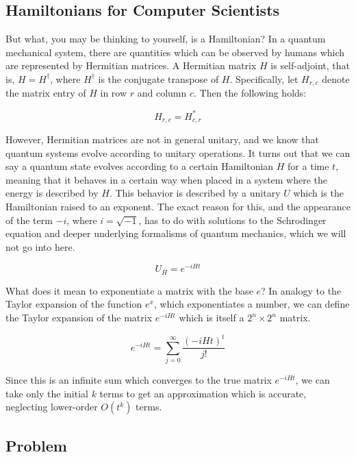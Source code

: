 \subsection{Hamiltonians for Computer Scientists}

But what, you may be thinking to yourself, is a Hamiltonian?
In a quantum mechanical system, there are quantities which can be observed
by humans which are represented by Hermitian matrices. A Hermitian matrix
$H$ is self-adjoint, that is, $H=H^\dagger$, where $H^\dagger$ is the
conjugate transpose of $H$. Specifically, let $H_{r,c}$ denote the matrix
entry of $H$ in row $r$ and column $c$. Then the following holds:

\begin{equation}
H_{r,c} = H^*_{c,r}
\end{equation}

However, Hermitian matrices are not in general unitary, and we know that
quantum systems evolve according to unitary operations. It turns out that
we can say a quantum state evolves according to a certain Hamiltonian $H$ for
a time $t$, meaning that it behaves in a certain way when placed in a system
where the energy is described by $H$. This behavior is described by a unitary
$U$
which is the Hamiltonian raised to an exponent. The exact reason for this,
and the appearance of the term $-i$, where $i = \sqrt{-1}$, has to do with
solutions to the Schrodinger equation and deeper underlying formalisms of
quantum mechanics, which we will not go into here.

\begin{displaymath}
U_H = e^{-iHt}
\end{displaymath}

What does it mean to exponentiate a matrix with the base $e$? In analogy to 
the Taylor expansion of the function $e^x$, which exponentiates a number,
we can define the Taylor expansion of the matrix $e^{-iHt}$ which is itself
a $2^n\times 2^n$ matrix.

\begin{displaymath}
e^{-iHt} = \sum_{j=0}^{\infty} \frac{(-iHt)^t}{j!}
\end{displaymath}

Since this is an infinite sum which converges to the true matrix
$e^{-iHt}$, we can take only the initial $k$ terms to get an approximation
which is accurate, neglecting lower-order $O(t^k)$ terms.

\subsection{Problem}

